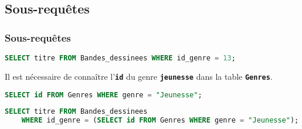 \documentclass[svgnames,11pt]{beamer}
\begin{document}
\subsection{Sous-requêtes}
\begin{frame}[fragile]
    \frametitle{Sous-requêtes}

\begin{center}
\begin{lstlisting}[language=SQL , basicstyle=\ttfamily\small, xleftmargin=1em, xrightmargin=0em]
SELECT titre FROM Bandes_dessinees WHERE id_genre = 13;
\end{lstlisting}
\label{jeunesse}
\end{center}   
\begin{aretenir}[Remarque]
    Il est nécessaire de connaître l'\textbf{\texttt{id}} du genre \textbf{\texttt{jeunesse}} dans la table \texttt{\textbf{Genres}}.
\end{aretenir}
\end{frame}
\begin{frame}[fragile]

\begin{center}
\begin{lstlisting}[language=SQL , basicstyle=\ttfamily\small, xleftmargin=1em, xrightmargin=0em]
SELECT id FROM Genres WHERE genre = "Jeunesse";
\end{lstlisting}
\end{center}   

\end{frame}
\begin{frame}[fragile]

\begin{center}
\begin{lstlisting}[language=SQL , basicstyle=\ttfamily\small, xleftmargin=1em, xrightmargin=0em]
SELECT titre FROM Bandes_dessinees 
    WHERE id_genre = (SELECT id FROM Genres WHERE genre = "Jeunesse");
\end{lstlisting}
\label{sous}
\end{center}   
    
    \end{frame}
\end{document}
